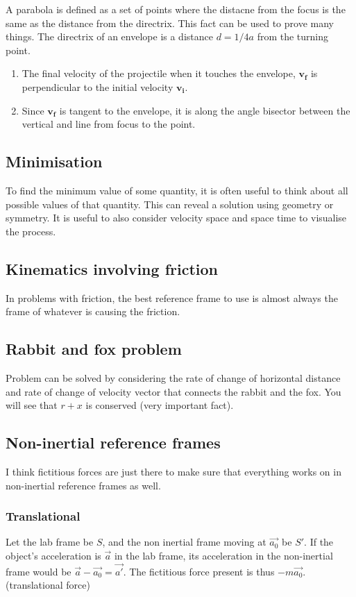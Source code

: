 A parabola is defined as a set of points where the distacne from the focus is the same as the distance from the directrix. This fact can be used to prove many things. The directrix of an envelope is a distance $d=1/4a$ from the turning point. 

\begin{enumerate}
    \item The final velocity of the projectile when it touches the envelope, $\mathbf{v_f}$ is perpendicular to the initial velocity $\mathbf{v_i}$.
    \item Since $\mathbf{v_f}$ is tangent to the envelope, it is along the angle bisector between the vertical and line from focus to the point. 
\end{enumerate}



\subsection{Minimisation}
To find the minimum value of some quantity, it is often useful to think about all possible values of that quantity. This can reveal a solution using geometry or symmetry. It is useful to also consider velocity space and space time to visualise the process. 

\subsection{Kinematics involving friction}
In problems with friction, the best reference frame to use is almost always the frame of whatever is causing the friction. 

\subsection{Rabbit and fox problem}
Problem can be solved by considering the rate of change of horizontal distance and rate of change of velocity vector that connects the rabbit and the fox. You will see that $r+x$ is conserved (very important fact).

\subsection{Non-inertial reference frames}
I think fictitious forces are just there to make sure that everything works on in non-inertial reference frames as well.

\subsubsection{Translational}
Let the lab frame be $S$, and the non inertial frame moving at $\vec{a_0}$ be $S'$. If the object's acceleration is $\vec{a}$ in the lab frame, its acceleration in the non-inertial frame would be $\vec{a}-\vec{a_0}=\vec{a'}$. The fictitious force present is thus $-m \vec{a_0}$. (translational force)

